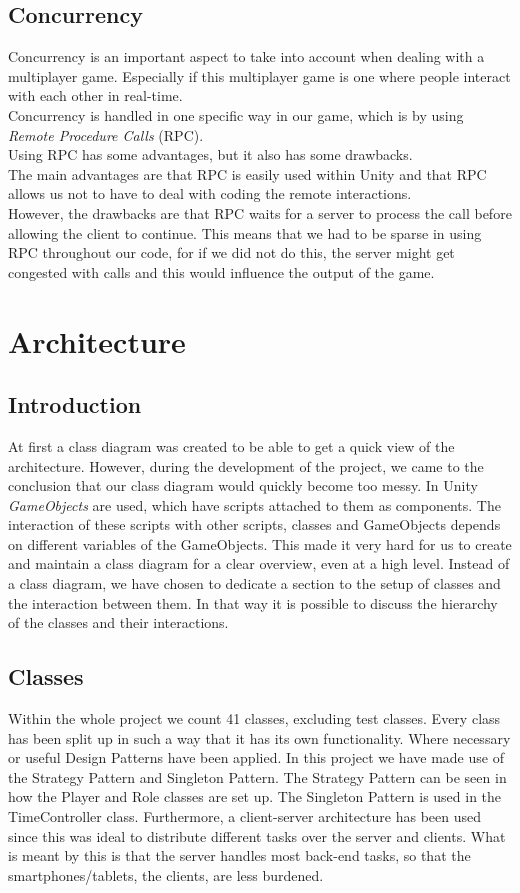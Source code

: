 \documentclass[11pt,twoside,a4paper]{article}
\begin{document}
\subsection{Concurrency}
Concurrency is an important aspect to take into account when dealing with a multiplayer game. Especially if this multiplayer game is one where people interact with each other in real-time.\\
Concurrency is handled in one specific way in our game, which is by using \emph{Remote Procedure Calls} (RPC).\\
Using RPC has some advantages, but it also has some drawbacks.\\
The main advantages are that RPC is easily used within Unity and that RPC allows us not to have to deal with coding the remote interactions.\\
However, the drawbacks are that RPC waits for a server to process the call before allowing the client to continue. This means that we had to be sparse in using RPC throughout our code, for if we did not do this, the server might get congested with calls and this would influence the output of the game.\\


\newpage

\section{Architecture}
\subsection{Introduction}
At first a class diagram was created to be able to get a quick view of the architecture. However, during the development of the project, we came to the conclusion that our class diagram would quickly become too messy. In Unity \emph{GameObjects} are used, which have scripts attached to them as components. The interaction of these scripts with other scripts, classes and GameObjects depends on different variables of the GameObjects. This made it very hard for us to create and maintain a class diagram for a clear overview, even at a high level.
Instead of a class diagram, we have chosen to dedicate a section to the setup of classes and the interaction between them. In that way it is possible to discuss the hierarchy of the classes and their interactions.

\subsection{Classes}
Within the whole project we count 41 classes, excluding test classes. Every class has been split up in such a way that it has its own functionality. Where necessary or useful Design Patterns have been applied. In this project we have made use of the Strategy Pattern and Singleton Pattern. The Strategy Pattern can be seen in how the Player and Role classes are set up. The Singleton Pattern is used in the TimeController class. Furthermore, a client-server architecture has been used since this was ideal to distribute different tasks over the server and clients. What is meant by this is that the server handles most back-end tasks, so that the smartphones/tablets, the clients, are less burdened.
\end{document}
